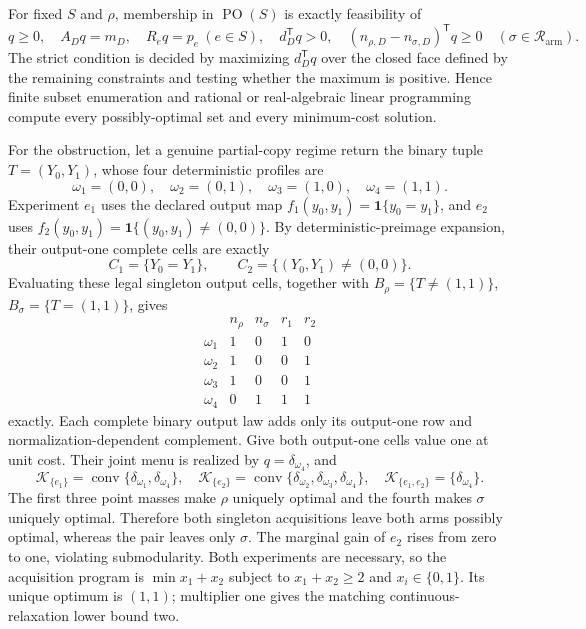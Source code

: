 For fixed \(S\) and \(\rho\), membership in \(\operatorname{PO}(S)\) is exactly feasibility of
\[
q\geq0,\quad A_Dq=m_D,\quad R_eq=p_e\ (e\in S),\quad
d_D^{\mathsf T}q>0,\quad
(n_{\rho,D}-n_{\sigma,D})^{\mathsf T}q\geq0
\quad(\sigma\in\mathcal R_{\mathrm{arm}}).
\tag{1}
\]
The strict condition is decided by maximizing \(d_D^{\mathsf T}q\) over the closed face defined by the remaining constraints and testing whether the maximum is positive.  Hence finite subset enumeration and rational or real-algebraic linear programming compute every possibly-optimal set and every minimum-cost solution.

For the obstruction, let a genuine partial-copy regime return the binary tuple \(T=(Y_0,Y_1)\), whose four deterministic profiles are
\[
\omega_1=(0,0),\quad\omega_2=(0,1),\quad
\omega_3=(1,0),\quad\omega_4=(1,1).
\]
Experiment \(e_1\) uses the declared output map \(f_1(y_0,y_1)=\mathbf1\{y_0=y_1\}\), and \(e_2\) uses \(f_2(y_0,y_1)=\mathbf1\{(y_0,y_1)\ne(0,0)\}\).  By deterministic-preimage expansion, their output-one complete cells are exactly
\[
C_1=\{Y_0=Y_1\},\qquad
C_2=\{(Y_0,Y_1)\ne(0,0)\}.
\]
Evaluating these legal singleton output cells, together with \(B_\rho=\{T\ne(1,1)\}\), \(B_\sigma=\{T=(1,1)\}\), gives
\[
\begin{array}{c|rrrr}
&n_\rho&n_\sigma&r_1&r_2\\\hline
\omega_1&1&0&1&0\\
\omega_2&1&0&0&1\\
\omega_3&1&0&0&1\\
\omega_4&0&1&1&1
\end{array}
\tag{2}
\]
exactly.  Each complete binary output law adds only its output-one row and normalization-dependent complement.  Give both output-one cells value one at unit cost.  Their joint menu is realized by \(q=\delta_{\omega_4}\), and
\[
\mathcal K_{\{e_1\}}=\operatorname{conv}\{\delta_{\omega_1},\delta_{\omega_4}\},\quad
\mathcal K_{\{e_2\}}=\operatorname{conv}\{\delta_{\omega_2},\delta_{\omega_3},\delta_{\omega_4}\},\quad
\mathcal K_{\{e_1,e_2\}}=\{\delta_{\omega_4}\}.
\]
The first three point masses make \(\rho\) uniquely optimal and the fourth makes \(\sigma\) uniquely optimal.  Therefore both singleton acquisitions leave both arms possibly optimal, whereas the pair leaves only \(\sigma\).  The marginal gain of \(e_2\) rises from zero to one, violating submodularity.  Both experiments are necessary, so the acquisition program is \(\min x_1+x_2\) subject to \(x_1+x_2\geq2\) and \(x_i\in\{0,1\}\).  Its unique optimum is \((1,1)\); multiplier one gives the matching continuous-relaxation lower bound two.